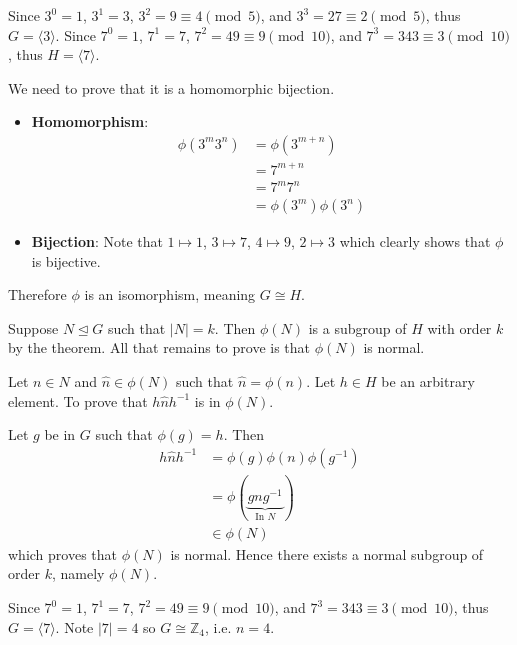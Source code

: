\begin{questions}
    \item \begin{partquestions}{\roman*}
        \item Since $3^0 = 1$, $3^1 = 3$, $3^2 = 9 \equiv 4 \pmod{5}$, and $3^3 = 27 \equiv 2 \pmod{5}$, thus $G = \langle 3 \rangle$. Since $7^0 = 1$, $7^1 = 7$, $7^2 = 49 \equiv 9 \pmod{10}$, and $7^3 = 343 \equiv 3 \pmod{10}$, thus $H = \langle 7 \rangle$.
        \item We need to prove that it is a homomorphic bijection.
        \begin{itemize}
            \item \textbf{Homomorphism}:
            \begin{align*}
                \phi(3^m3^n) &= \phi(3^{m+n})\\
                &= 7^{m+n}\\
                &= 7^m7^n\\
                &= \phi(3^m)\phi(3^n)
            \end{align*}

            \item \textbf{Bijection}: Note that $1 \mapsto 1$, $3 \mapsto 7$, $4 \mapsto 9$, $2 \mapsto 3$ which clearly shows that $\phi$ is bijective.
        \end{itemize}
        Therefore $\phi$ is an isomorphism, meaning $G \cong H$.
    \end{partquestions}

    \item Suppose $N \unlhd G$ such that $|N| = k$. Then $\phi(N)$ is a subgroup of $H$ with order $k$ by the theorem. All that remains to prove is that $\phi(N)$ is normal.

    Let $n \in N$ and $\hat{n} \in \phi(N)$ such that $\hat{n} = \phi(n)$. Let $h \in H$ be an arbitrary element. To prove that $h\hat{n}h^{-1}$ is in $\phi(N)$.

    Let $g$ be in $G$ such that $\phi(g) = h$. Then
    \begin{align*}
        h\hat{n}h^{-1} &= \phi(g)\phi(n)\phi(g^{-1})\\
        &= \phi(\underbrace{gng^{-1}}_{\text{In } N})\\
        &\in \phi(N)
    \end{align*}
    which proves that $\phi(N)$ is normal. Hence there exists a normal subgroup of order $k$, namely $\phi(N)$.

    \item Since $7^0 = 1$, $7^1 = 7$, $7^2 = 49 \equiv 9 \pmod{10}$, and $7^3 = 343 \equiv 3 \pmod{10}$, thus $G = \langle 7 \rangle$. Note $|7| = 4$ so $G \cong \mathbb{Z}_4$, i.e. $n = 4$.
\end{questions}
